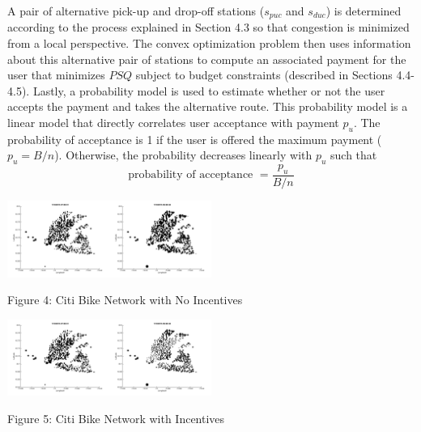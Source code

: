 \documentclass[times, 10pt,twocolumn]{article}
\begin{document}
A pair of alternative pick-up and drop-off stations ($s_{puc}$ and $s_{duc}$) is determined according to the process explained in Section 4.3 so that congestion is minimized from a local perspective. The convex optimization problem then uses information about this alternative pair of stations to compute an associated payment for the user that minimizes $PSQ$ subject to budget constraints (described in Sections 4.4-4.5). Lastly, a probability model is used to estimate whether or not the user accepts the payment and takes the alternative route. This probability model is a linear model that directly correlates user acceptance with payment $p_u$. The probability of acceptance is 1 if the user is offered the maximum payment ($p_u = B/n$). Otherwise, the probability decreases linearly with $p_u$ such that
\begin{equation}
\text{probability of acceptance } = \frac{p_u}{B/n}
\end{equation}

\centerline{\includegraphics[width=0.25\textwidth]{m4/no_incentives_before.png}\includegraphics[width=0.25\textwidth]{m4/no_incentives_after.png}}
\centerline{Figure 4: Citi Bike Network with No Incentives}
\hfill \break
\centerline{\includegraphics[width=0.25\textwidth]{m4/incentives_before.png}\includegraphics[width=0.25\textwidth]{m4/incentives_after.png}}
\centerline{Figure 5: Citi Bike Network with Incentives}
\hfill \break
\end{document}

